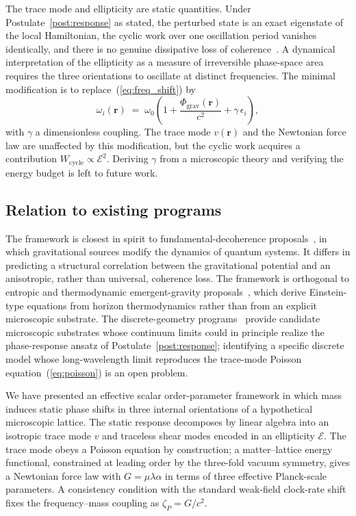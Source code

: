 \documentclass[a4paper,fleqn]{cas-dc}
\theoremstyle{thmstyleone}%
\theoremstyle{thmstyletwo}%
\begin{document}
The trace mode and ellipticity are static quantities. Under
Postulate~\ref{post:response} as stated, the perturbed state
is an exact eigenstate of the local Hamiltonian, the
cyclic work over one oscillation period vanishes identically,
and there is no genuine dissipative loss of
coherence~\cite{BreuerPetruccione2002}. A dynamical
interpretation of the ellipticity as a measure of irreversible
phase-space area requires the three orientations to oscillate
at distinct frequencies. The minimal modification is to
replace~(\ref{eq:freq_shift}) by
\begin{equation}
    \omega_i(\mathbf{r})
    \;=\;
    \omega_0\!\left(1+\frac{\Phi_{\mathrm{grav}}(\mathbf{r})}{c^2}
    +\gamma\,\epsilon_i\right),
    \label{eq:freq_split}
\end{equation}
with $\gamma$ a dimensionless coupling. The trace mode $v(\mathbf{r})$ and the
Newtonian force law are unaffected by this modification, but
the cyclic work acquires a contribution
$W_{\mathrm{cycle}}\propto\mathcal{E}^2$. Deriving $\gamma$
from a microscopic theory and verifying the energy budget is
left to future work.

\subsection{Relation to existing programs}

The framework is closest in spirit to fundamental-decoherence
proposals~\cite{Diosi1989,Penrose1996,
BassiGrossardtUlbricht2017}, in which gravitational sources
modify the dynamics of quantum systems. It differs in
predicting a structural correlation between the gravitational
potential and an anisotropic, rather than universal, coherence
loss. The framework is orthogonal to entropic and
thermodynamic emergent-gravity
proposals~\cite{Jacobson1995,Verlinde2011,Padmanabhan2010},
which derive Einstein-type equations from horizon
thermodynamics rather than from an explicit microscopic
substrate. The discrete-geometry
programs~\cite{Rovelli2004,AshtekarLewandowski2004,AJL2012,
Sorkin1991,Oriti2012} provide candidate microscopic
substrates whose continuum limits could in principle realize
the phase-response ansatz of
Postulate~\ref{post:response}; identifying a specific
discrete model whose long-wavelength limit reproduces the
trace-mode Poisson equation~(\ref{eq:poisson}) is an open
problem.


\label{sec:conclusions}

We have presented an effective scalar order-parameter framework
in which mass induces static phase shifts in three internal
orientations of a hypothetical microscopic lattice. The static
response decomposes by linear algebra into an isotropic trace
mode $v$ and traceless shear modes encoded
in an ellipticity $\mathcal{E}$. The trace mode obeys a Poisson
equation by construction; a matter--lattice energy functional,
constrained at leading order by the three-fold vacuum symmetry,
gives a Newtonian force law with $G=\mu\lambda\alpha$ in terms
of three effective Planck-scale parameters. A consistency condition with
the standard weak-field clock-rate shift fixes the
frequency--mass coupling as $\zeta_P=G/c^2$.
\end{document}
